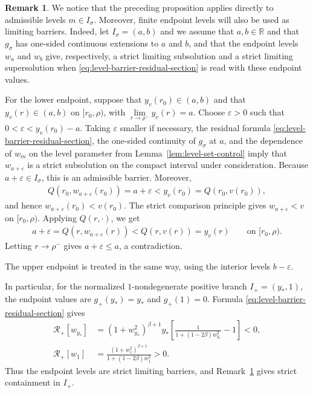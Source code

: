 \documentclass{amsart}
\theoremstyle{plain}
\theoremstyle{mainintrothm}
\theoremstyle{definition}
\newtheorem{remark}[theorem]{Remark}
\begin{document}
\begin{remark}
	\label{rem:endpoint-strict-containment}
	We notice that the preceding proposition applies directly to admissible levels
	$m\in I_\sigma$. Moreover, finite endpoint levels will also be used as limiting
	barriers. Indeed,  let $I_\sigma=(a,b)$ and we assume that $a,b\in\mathbb R$ and
	that $g_\sigma$ has one-sided continuous extensions to $a$ and $b$, and that
	the endpoint levels $w_a$ and $w_b$ give, respectively, a strict limiting
	subsolution and a strict limiting supersolution when
	\eqref{eq:level-barrier-residual-section} is read with these endpoint
	values.
	
	\medskip
	
	For the lower endpoint, suppose that $y_v(r_0)\in(a,b)$ and that
	$y_v(r)\in(a,b)$ on $[r_0,\rho)$, with $\lim\limits_{r\to\rho^-}y_v(r)=a$. Choose $\varepsilon>0$ such that
	$0<\varepsilon<y_v(r_0)-a$.  Taking $\varepsilon$ smaller if necessary, the
	residual formula \eqref{eq:level-barrier-residual-section}, the one-sided
	continuity of $g_\sigma$ at $a$, and the dependence of $w_m$ on the level
	parameter from Lemma~\ref{lem:level-set-control} imply that
	$w_{a+\varepsilon}$ is a strict subsolution on the compact interval under
	consideration.  Because $a+\varepsilon\in I_\sigma$, this is an admissible
	barrier.  Moreover,
	\begin{align*}
		Q(r_0,w_{a+\varepsilon}(r_0))
		=
		a+\varepsilon
		<
		y_v(r_0)
		=
		Q(r_0,v(r_0)),
	\end{align*}
	and hence $w_{a+\varepsilon}(r_0)<v(r_0)$.  The strict comparison principle
	gives $w_{a+\varepsilon}<v$ on $[r_0,\rho)$.  Applying $Q(r,\cdot)$, we get
	\begin{align*}
		a+\varepsilon
		=
		Q(r,w_{a+\varepsilon}(r))
		<
		Q(r,v(r))
		=
		y_v(r)
		\qquad
		\text{on }[r_0,\rho).
	\end{align*}
	Letting $r\to\rho^-$ gives $a+\varepsilon\leq a$, a contradiction.
	
	\medskip
	
	The upper endpoint is treated in the same way, using the interior levels
	$b-\varepsilon$.
\end{remark}

In particular, for the normalized $1$-nondegenerate positive branch
$I_+=(y_*,1)$, the endpoint values are $g_+(y_*)=y_*$ and $g_+(1)=0$.  Formula
\eqref{eq:level-barrier-residual-section} gives
\begin{align*}
	\mathcal R_+[w_{y_*}]
	&=
	(1+w_{y_*}^2)^{\beta+1}
	y_*\left[
	\frac{1}{1+(1-2\beta)w_{y_*}^2}
	-
	1
	\right]
	<0,
	\\
	\mathcal R_+[w_1]
	&=
	\frac{(1+w_1^2)^{\beta+1}}
	{1+(1-2\beta)w_1^2}
	>
	0.
\end{align*}
Thus the endpoint levels are strict limiting barriers, and
Remark~\ref{rem:endpoint-strict-containment} gives strict containment in
$I_+$.
	
\end{document}

